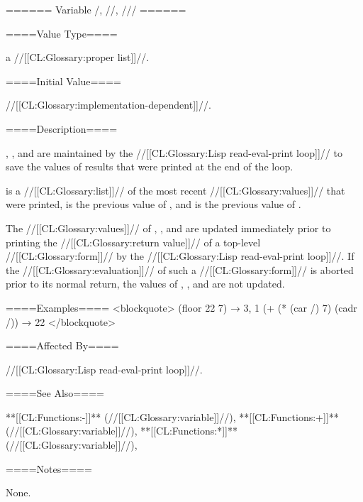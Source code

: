 ====== Variable /, //, /// ======

====Value Type====

a //[[CL:Glossary:proper list]]//.

====Initial Value====

//[[CL:Glossary:implementation-dependent]]//.

====Description====

\Thevariables{/}, \misc{//}, and \misc{///} are maintained by the //[[CL:Glossary:Lisp read-eval-print loop]]// to save the values of results that were printed at the end of the loop.

\Thevalueof{/} is a //[[CL:Glossary:list]]// of the most recent //[[CL:Glossary:values]]// that were printed, \thevalueof{//} is the previous value of \misc{/}, and \thevalueof{///} is the previous value of \misc{//}.

The //[[CL:Glossary:values]]// of \misc{/}, \misc{//}, and \misc{///} are updated immediately prior to printing the //[[CL:Glossary:return value]]// of a top-level //[[CL:Glossary:form]]// by the //[[CL:Glossary:Lisp read-eval-print loop]]//. If the //[[CL:Glossary:evaluation]]// of such a //[[CL:Glossary:form]]// is aborted prior to its normal return, the values of \misc{/}, \misc{//}, and \misc{///} are not updated.

====Examples==== <blockquote> (floor 22 7) → 3, 1 (+ (* (car /) 7) (cadr /)) → 22 </blockquote>

====Affected By====

//[[CL:Glossary:Lisp read-eval-print loop]]//.

====See Also====

**[[CL:Functions:-]]** (//[[CL:Glossary:variable]]//), **[[CL:Functions:+]]** (//[[CL:Glossary:variable]]//), **[[CL:Functions:*]]** (//[[CL:Glossary:variable]]//), {\secref\TopLevelLoop}

====Notes====

None.

